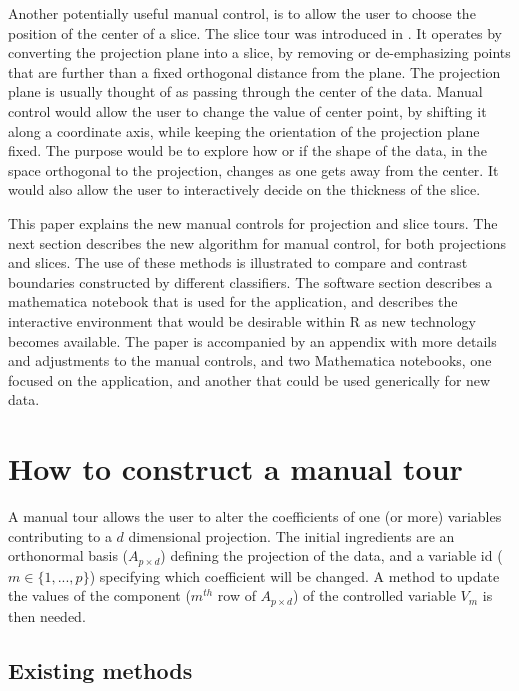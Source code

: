 \documentclass[]{interact}
\theoremstyle{plain}%
\theoremstyle{definition}
\theoremstyle{remark}
\begin{document}
Another potentially useful manual control, is to allow the user to
choose the position of the center of a slice. The slice tour was
introduced in \citet{slicetour}. It operates by converting the
projection plane into a slice, by removing or de-emphasizing points that
are further than a fixed orthogonal distance from the plane. The
projection plane is usually thought of as passing through the center of
the data. Manual control would allow the user to change the value of
center point, by shifting it along a coordinate axis, while keeping the
orientation of the projection plane fixed. The purpose would be to
explore how or if the shape of the data, in the space orthogonal to the
projection, changes as one gets away from the center. It would also
allow the user to interactively decide on the thickness of the slice.

This paper explains the new manual controls for projection and slice
tours. The next section describes the new algorithm for manual control,
for both projections and slices. The use of these methods is illustrated
to compare and contrast boundaries constructed by different classifiers.
The software section describes a mathematica notebook that is used for
the application, and describes the interactive environment that would be
desirable within R as new technology becomes available. The paper is
accompanied by an appendix with more details and adjustments to the
manual controls, and two Mathematica notebooks, one focused on the
application, and another that could be used generically for new data.

\hypertarget{sec:method}{%
\section{How to construct a manual tour}\label{sec:method}}

A manual tour allows the user to alter the coefficients of one (or more)
variables contributing to a \(d\) dimensional projection. The initial
ingredients are an orthonormal basis (\(A_{p\times d}\)) defining the
projection of the data, and a variable id (\(m \in \{1, ..., p\}\))
specifying which coefficient will be changed. A method to update the
values of the component (\(m^{th}\) row of \(A_{p\times d}\)) of the
controlled variable \(V_m\) is then needed.

\hypertarget{existing-methods}{%
\subsection{Existing methods}\label{existing-methods}}
\end{document}
